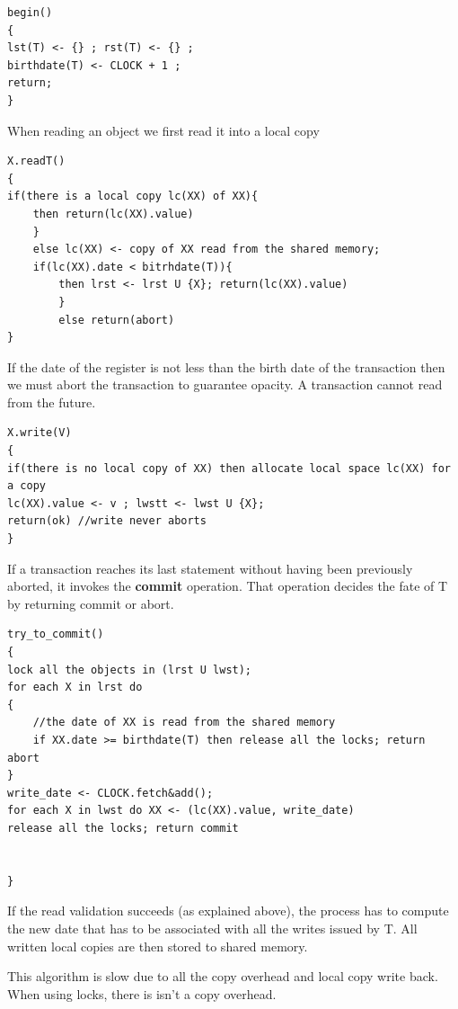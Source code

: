 \documentclass[twoside]{article}
\begin{document}
\begin{lstlisting}
begin()
{
lst(T) <- {} ; rst(T) <- {} ;
birthdate(T) <- CLOCK + 1 ; 
return;
}
\end{lstlisting}

When reading an object we first read it into a local copy

\begin{lstlisting}
X.readT()
{
if(there is a local copy lc(XX) of XX){
	then return(lc(XX).value)
    }
    else lc(XX) <- copy of XX read from the shared memory;
    if(lc(XX).date < bitrhdate(T)){
    	then lrst <- lrst U {X}; return(lc(XX).value)
        }
        else return(abort)
}

\end{lstlisting}
If the date of the register is not less than the birth date of the transaction then we must abort the transaction to guarantee opacity. A transaction cannot read from the future.

\begin{lstlisting}
X.write(V)
{
if(there is no local copy of XX) then allocate local space lc(XX) for a copy
lc(XX).value <- v ; lwstt <- lwst U {X};
return(ok) //write never aborts
}

\end{lstlisting}

If a transaction reaches its last statement without having been previously aborted, it invokes the \textbf{commit} operation. That operation decides the fate of T by returning commit or abort.

\begin{lstlisting}
try_to_commit()
{
lock all the objects in (lrst U lwst);
for each X in lrst do
{
	//the date of XX is read from the shared memory
    if XX.date >= birthdate(T) then release all the locks; return abort
}
write_date <- CLOCK.fetch&add();
for each X in lwst do XX <- (lc(XX).value, write_date) 
release all the locks; return commit


}

\end{lstlisting}

If the read validation succeeds (as explained above), the process has to compute the new date that has to be associated with all the writes issued by T. All written local copies are then stored to shared memory.

This algorithm is slow due to all the copy overhead and local copy write back. When using locks, there is isn't a copy overhead.
\end{document}
